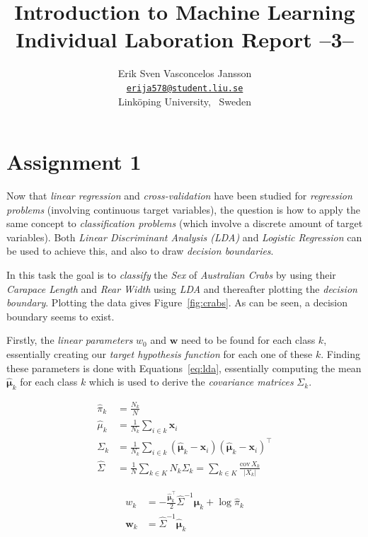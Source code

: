 \documentclass[a4paper, twocolumn]{article}
\title{Introduction to Machine Learning \\
       Individual Laboration Report --3--}
\author{{Erik Sven Vasconcelos Jansson} \\
        {\href{mailto:erija578@student.liu.se}
        {\texttt{erija578@student.liu.se}}} \\
        {Linköping University, \, Sweden}}
\begin{document}
    \maketitle %

    \section*{Assignment 1}

        Now that \emph{linear regression} and \emph{cross-validation} have been studied for \emph{regression problems} (involving continuous target variables), the question is how to apply the same concept to \emph{classification problems} (which involve a discrete amount of target variables). Both \emph{Linear Discriminant Analysis (LDA)} and \emph{Logistic Regression} can be used to achieve this, and also to draw \emph{decision boundaries}.

        In this task the goal is to \emph{classify} the \emph{Sex} of \emph{Australian Crabs} by using their \emph{Carapace Length} and \emph{Rear Width} using \emph{LDA} and thereafter plotting the \emph{decision boundary}. Plotting the data gives Figure~\ref{fig:crabs}. As can be seen, a decision boundary seems to exist.

        Firstly, the \emph{linear parameters} $w_0$ and $\bm{w}$ need to be found for each class $k$, essentially creating our \emph{target hypothesis function} for each one of these $k$. Finding these parameters is done with Equations~\ref{eq:lda}, essentially computing the mean $\bm{\hat{\mu}}_k$ for each class $k$ which is used to derive the \emph{covariance matrices} $\Sigma_k$.

        \begin{equation} \label{eq:lda}
        \begin{split}
            \hat{\pi}_k &= \frac{N_k}{N} \\
            \hat{\mu}_k &= \frac{1}{N_k}\sum_{i \in k}{\bm{x}_i} \\
            \Sigma_k &= \frac{1}{N_k}\sum_{i \in k}{(\bm{\hat{\mu}}_k - \bm{x}_i)(\bm{\hat{\mu}}_k - \bm{x}_i)^\intercal} \\
            \hat\Sigma &= \frac{1}{N}\sum_{k \in K}{N_k \Sigma_k} = \sum_{k \in K}{\frac{\mathrm{cov}\,X_k}{|X_k|}}
        \end{split}
        \end{equation}

        \begin{equation} \label{eq:weights}
        \begin{split}
            w_{k} &= -\frac{\bm{\hat\mu}_k^\intercal}{2}\hat\Sigma^{-1}\bm{\hat\mu}_k + \log\hat{\pi}_k \\
            \bm{w}_{k} &= \hat\Sigma^{-1}\bm{\hat\mu}_k
        \end{split}
        \end{equation}
\end{document}

